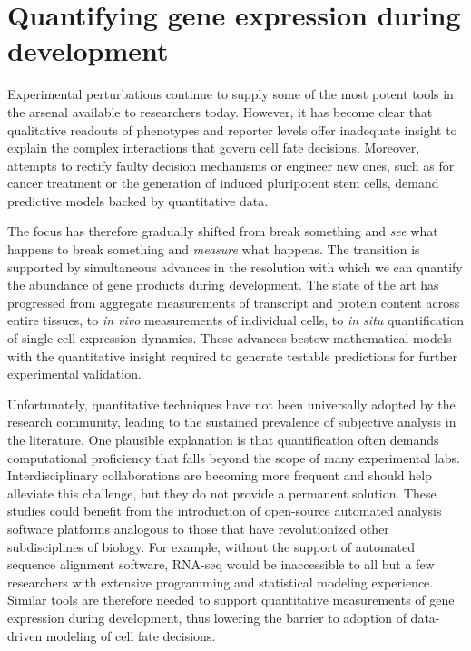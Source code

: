 \section{Quantifying gene expression during development}

Experimental perturbations continue to supply some of the most potent tools in the arsenal available to researchers today. However, it has become clear that qualitative readouts of phenotypes and reporter levels offer inadequate insight to explain the complex interactions that govern cell fate decisions. Moreover, attempts to rectify faulty decision mechanisms or engineer new ones, such as for cancer treatment or the generation of induced pluripotent stem cells, demand predictive models backed by quantitative data.

The focus has therefore gradually shifted from break something and \textit{see} what happens to break something and \textit{measure} what happens. The transition is supported by simultaneous advances in the resolution with which we can quantify the abundance of gene products during development. The state of the art has progressed from aggregate measurements of transcript and protein content across entire tissues, to \emph{in vivo} measurements of individual cells, to \emph{in situ} quantification of single-cell expression dynamics. These advances bestow mathematical models with the quantitative insight required to generate testable predictions for further experimental validation.

Unfortunately, quantitative techniques have not been universally adopted by the research community, leading to the sustained prevalence of subjective analysis in the literature. One plausible explanation is that quantification often demands computational proficiency that falls beyond the scope of many experimental labs. Interdisciplinary collaborations are becoming more frequent and should help alleviate this challenge, but they do not provide a permanent solution. These studies could benefit from the introduction of open-source automated analysis software platforms analogous to those that have revolutionized other subdisciplines of biology. For example, without the support of automated sequence alignment software, RNA-seq would be inaccessible to all but a few researchers with extensive programming and statistical modeling experience. Similar tools are therefore needed to support quantitative measurements of gene expression during development, thus lowering the barrier to adoption of data-driven modeling of cell fate decisions.





